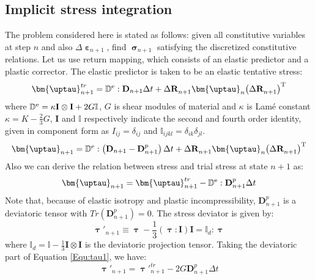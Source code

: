 \subsection{Implicit stress integration}
\noindent
The problem considered here is stated as follows: given all constitutive variables at step $n$ and also $\Delta {{\bm{\upepsilon }}_{n + 1}}$, find $\bm{\upsigma}_{n+1}$  satisfying the discretized constitutive relations. Let us use return mapping, which consists of an elastic predictor and a plastic corrector. The elastic predictor is taken to be an elastic tentative stress:
\begin{equation}
{\bm{\uptau }}_{n + 1}^{tr} = {\mathbb{D}^{\rm{e}}}: {{\mathbf{D}}_{n + 1} \Delta t} + \Delta {\mathbf{R}}_{n + 1}^{}{{\bm{\uptau }}_n}{\left( {\Delta {\mathbf{R}}_{n + 1}^{}} \right)^{\rm{T}}}
\end{equation}
where ${\mathbb{D}^{\rm{e}}} = \kappa {\mathbf{I}} \otimes {\mathbf{I}} + 2G\mathbb{I}$, $G$ is shear modules of material and $\kappa$ is Lam\'{e} constant $\kappa  = K - \frac{2}{3}G$, ${\mathbf{I}}$ and $\mathbb{I}$ respectively indicate the second and fourth order identity, given in component form as ${I_{ij}} = {\delta _{ij}}$ and ${\mathbb{I}_{ijkl}} = {\delta _{ik}}{\delta _{jl}}$.
\begin{equation}
{\bm{\uptau }}_{n + 1} = {\mathbb{D}^{\rm{e}}}: \left( {\mathbf{D}}_{n + 1} -{\mathbf{D}}_{n + 1}^p \right) \Delta t + \Delta {\mathbf{R}}_{n + 1}^{}{{\bm{\uptau }}_n}{\left( {\Delta {\mathbf{R}}_{n + 1}^{}} \right)^{\rm{T}}}
\end{equation}
Also we can derive the relation between stress and trial stress at state $n+1$ as:
\begin{equation}
\label{Equ:tau1}
{\bm{\uptau }}_{n + 1} = {\bm{\uptau }}_{n + 1}^{tr} - {\mathbb{D}^{\rm{e}}}: {\mathbf{D}}_{n + 1}^p \Delta t
\end{equation}
Note that, because of elastic isotropy and plastic incompressibility, ${\mathbf{D}}_{n + 1}^p$ is a deviatoric tensor with $Tr\left( {\mathbf{D}}_{n + 1}^p \right)=0$.
The stress deviator is given by:
\begin{equation}
{\bm{\uptau }}'_{n + 1} \equiv {\bm{\uptau }} - \frac{1}{3}\left( {{\bm{\uptau }}:{\mathbf{I}}} \right){\mathbf{I}} = {\mathbb{I}_d}:{\bm{\uptau }}
\end{equation}
where ${\mathbb{I}_d} = \mathbb{I} - \frac{1}{3}{\mathbf{I}} \otimes {\mathbf{I}}$ is the deviatoric projection tensor.
Taking the deviatoric part of Equation \ref{Equ:tau1}, we have:
\begin{equation}
{\bm{\uptau }}'_{n + 1} = {{\bm{\uptau }}'}_{n + 1}^{tr} - 2G{\mathbf{D}}_{n + 1}^p \Delta t
\end{equation}

